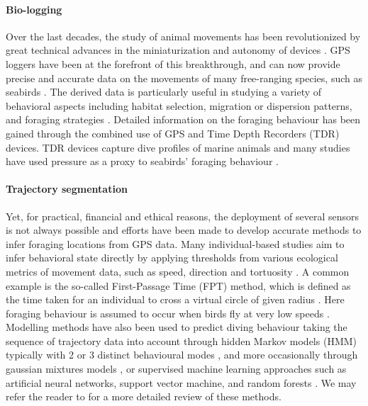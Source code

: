 \documentclass{article}
\begin{document}
\paragraph{Bio-logging}
Over the last decades, the study of animal movements has been revolutionized by great technical advances in the miniaturization and autonomy of devices \citep{hussey_aquatic_2015,ropert-coudert_diving_2009,monaco_bio-logging_2016}.
GPS loggers have been at the forefront of this breakthrough, and can now provide precise and accurate data on the movements of many free-ranging species, such as seabirds \citep{wakefield_quantifying_2009,yoda_advances_2019}.
The derived data is particularly useful in studying a variety of behavioral aspects including habitat selection, migration or dispersion patterns, and foraging
strategies \citep{nathan_movement_2008}.
Detailed information on the foraging behaviour has been gained through the combined use of GPS and Time Depth Recorders (TDR) devices.
TDR devices capture dive profiles of marine animals and many studies have used pressure as a proxy to seabirds' foraging behaviour \citep{cox_seabird_2016,lewis_flexible_2004,shoji_foraging_2015}.

\paragraph{Trajectory segmentation}
Yet, for practical, financial and ethical reasons, the deployment of several sensors is not always possible and efforts have been made to develop accurate methods to infer foraging locations from GPS data.
Many individual-based studies aim to infer behavioral state directly by applying thresholds from various ecological metrics of movement data, such as speed, direction and tortuosity \citep{dean_simultaneous_2015,seidel_ecological_2018}.
A common example is the so-called First-Passage Time (FPT) method, which is defined as the time taken for an individual to cross a virtual circle of given radius \citep{carter_navigating_2016,pinaud_at-sea_2007,sommerfeld_foraging_2013}. Here foraging behaviour is assumed to occur when birds fly at very low speeds \citep{weimerskirch_foraging_2008}.
Modelling methods have also been used to predict diving behaviour taking the sequence of trajectory data into account through hidden Markov models (HMM) typically with 2 or 3 distinct behavioural modes \citep{boyd_movement_2014,dunphy_seabirds_2020,mcclintock_momentuhmm_2018,oppel_foraging_2015}, and more occasionally through gaussian mixtures models \citep{guilford_gps_2008,mendez_geographical_2017}, or supervised machine learning approaches such as artificial neural networks, support vector machine, and random forests \citep{guilford_migration_2009, wang_machine_2019}. We may refer the reader to
\citep{joo_navigating_2020} for a more detailed review of these methods.
\end{document}

